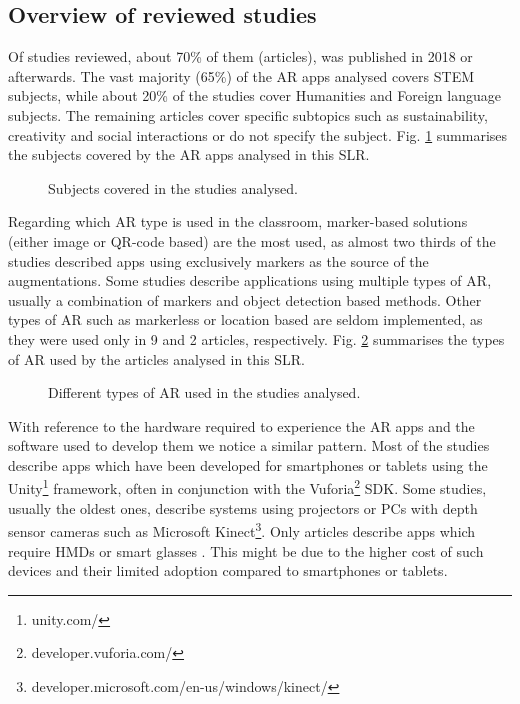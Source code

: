 \subsection{Overview of reviewed studies}

Of \papersSelected studies reviewed, about 70\% of them (\papersAfterTwentyEighteen articles), was published in 2018 or afterwards. The vast majority (65\%) of the AR apps analysed covers STEM subjects, while about 20\% of the studies cover Humanities and Foreign language subjects. The remaining articles cover specific subtopics such as sustainability, creativity and social interactions or do not specify the subject. Fig. \ref{fig:subjects} summarises the subjects covered by the AR apps analysed in this \gls{SLR}.

\begin{figure}[ht]	
	\begin{center}
	
	\caption{Subjects covered in the studies analysed.}
	\label{fig:subjects}
    \end{center}
\end{figure}

Regarding which AR type is used in the classroom, marker-based solutions (either image or QR-code based) are the most used, as almost two thirds of the studies described apps using exclusively markers as the source of the augmentations. 
Some studies describe applications using multiple types of \gls{AR}, usually a combination of markers and object detection based methods. Other types of \gls{AR} such as markerless or location based are seldom implemented, as they were used only in 9 and 2 articles, respectively. Fig. \ref{fig:artech} summarises the types of AR used by the articles analysed in this \gls{SLR}.

\begin{figure}[ht]	
	\begin{center}
	
	\caption{Different types of AR used in the studies analysed.}
	\label{fig:artech}
    \end{center}
\end{figure}

With reference to the hardware required to experience the AR apps and the software used to develop them we notice a similar pattern. Most of the studies describe apps which have been developed for smartphones or tablets using the Unity\footnote{unity.com/} framework, often in conjunction with the Vuforia\footnote{developer.vuforia.com/} \gls{SDK}. Some studies, usually the oldest ones, describe systems using projectors or PCs with depth sensor cameras such as Microsoft Kinect\footnote{developer.microsoft.com/en-us/windows/kinect/}. Only \hardwareHMD articles describe apps which require \glspl{HMD} or smart glasses \citep{wei2018improving, oh2016designing, oh2017hybrid, kum2019ar, khan2018mathland, matsutomo2017computer}. This might be due to the higher cost of such devices and their limited adoption compared to smartphones or tablets.


